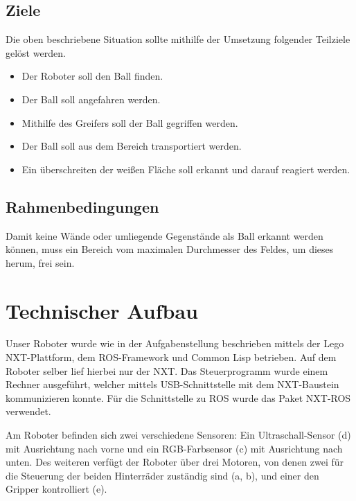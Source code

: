\documentclass{fetch-my-doc}
\begin{document}
			\subsection{Ziele}
			
			Die oben beschriebene Situation sollte mithilfe der Umsetzung folgender Teilziele gelöst werden. 
			
				\begin{itemize}
					\item Der Roboter soll den Ball finden.
					\item Der Ball soll angefahren werden.
					\item Mithilfe des Greifers soll der Ball gegriffen werden.
					\item Der Ball soll aus dem Bereich transportiert werden.
					\item Ein überschreiten der weißen Fläche soll erkannt und darauf reagiert werden.
				\end{itemize}
				
			\subsection{Rahmenbedingungen}
				
			Damit keine Wände oder umliegende Gegenstände als Ball erkannt werden können, muss ein Bereich vom maximalen Durchmesser des Feldes, um dieses herum, frei sein.

	\section{Technischer Aufbau}\label{sec:Aufbau}
    Unser Roboter wurde wie in der Aufgabenstellung beschrieben mittels der Lego NXT-Plattform, dem ROS-Framework und Common Lisp betrieben. Auf dem Roboter selber lief hierbei nur der NXT. Das Steuerprogramm wurde einem Rechner ausgeführt, welcher mittels USB-Schnittstelle mit dem NXT-Baustein kommunizieren konnte. Für die Schnittstelle zu ROS wurde das Paket NXT-ROS verwendet.

  Am Roboter befinden sich zwei verschiedene Sensoren: Ein Ultraschall-Sensor (d) mit Ausrichtung nach vorne und ein RGB-Farbsensor (c) mit Ausrichtung nach unten. Des weiteren verfügt der Roboter über drei Motoren, von denen zwei für die Steuerung der beiden Hinterräder zuständig sind (a, b), und einer den Gripper kontrolliert (e).
    
\end{document}

